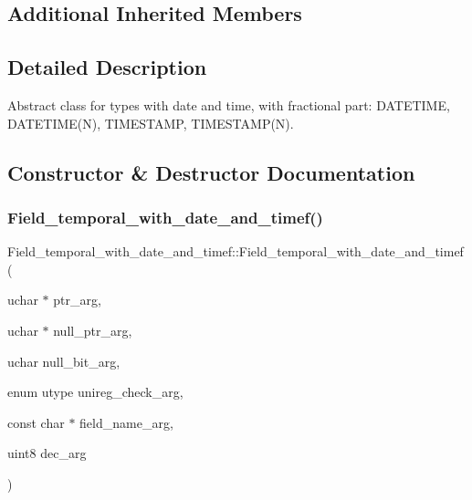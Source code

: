 \subsection*{Additional Inherited Members}


\subsection{Detailed Description}
Abstract class for types with date and time, with fractional part\+: D\+A\+T\+E\+T\+I\+ME, D\+A\+T\+E\+T\+I\+M\+E(\+N), T\+I\+M\+E\+S\+T\+A\+MP, T\+I\+M\+E\+S\+T\+A\+M\+P(\+N). 

\subsection{Constructor \& Destructor Documentation}
\mbox{\label{classField__temporal__with__date__and__timef_abd543fce5b4062ed73faf037ec246838}} 
\subsubsection{\texorpdfstring{Field\+\_\+temporal\+\_\+with\+\_\+date\+\_\+and\+\_\+timef()}{Field\_temporal\_with\_date\_and\_timef()}\hspace{0.1cm}{\footnotesize\ttfamily [1/2]}}
{\footnotesize\ttfamily Field\+\_\+temporal\+\_\+with\+\_\+date\+\_\+and\+\_\+timef\+::\+Field\+\_\+temporal\+\_\+with\+\_\+date\+\_\+and\+\_\+timef (\begin{DoxyParamCaption}\item[{uchar $\ast$}]{ptr\+\_\+arg,  }\item[{uchar $\ast$}]{null\+\_\+ptr\+\_\+arg,  }\item[{uchar}]{null\+\_\+bit\+\_\+arg,  }\item[{enum utype}]{unireg\+\_\+check\+\_\+arg,  }\item[{const char $\ast$}]{field\+\_\+name\+\_\+arg,  }\item[{uint8}]{dec\+\_\+arg }\end{DoxyParamCaption})\hspace{0.3cm}{\ttfamily [inline]}}

